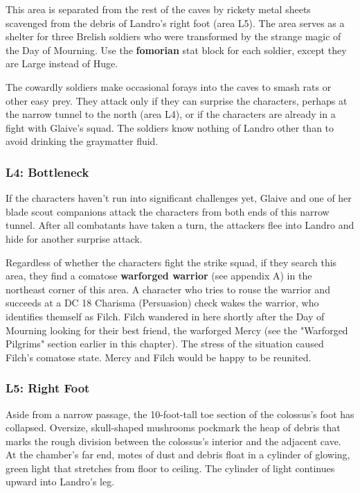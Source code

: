 \documentclass[10pt,a4paper,twoside,bg=print,twocolumn,openany,nodeprecatedcode]{dndbook}
\begin{document}
This area is separated from the rest of the caves by rickety metal sheets scavenged from the debris of Landro's right foot (area L5). The area serves as a shelter for three Brelish soldiers who were transformed by the strange magic of the Day of Mourning. Use the \textbf{fomorian} stat block for each soldier, except they are Large instead of Huge.

The cowardly soldiers make occasional forays into the caves to smash rats or other easy prey. They attack only if they can surprise the characters, perhaps at the narrow tunnel to the north (area L4), or if the characters are already in a fight with Glaive's squad. The soldiers know nothing of Landro other than to avoid drinking the graymatter fluid.

\subsubsection{L4: Bottleneck}
If the characters haven't run into significant challenges yet, Glaive and one of her blade scout companions attack the characters from both ends of this narrow tunnel. After all combatants have taken a turn, the attackers flee into Landro and hide for another surprise attack.

Regardless of whether the characters fight the strike squad, if they search this area, they find a comatose \textbf{warforged warrior} (see appendix A) in the northeast corner of this area. A character who tries to rouse the warrior and succeeds at a DC 18 Charisma (Persuasion) check wakes the warrior, who identifies themself as Filch. Filch wandered in here shortly after the Day of Mourning looking for their best friend, the warforged Mercy (see the "Warforged Pilgrims" section earlier in this chapter). The stress of the situation caused Filch's comatose state. Mercy and Filch would be happy to be reunited.

\subsubsection{L5: Right Foot}
\begin{DndReadAloud}{}
Aside from a narrow passage, the 10-foot-tall toe section of the colossus's foot has collapsed. Oversize, skull-shaped mushrooms pockmark the heap of debris that marks the rough division between the colossus's interior and the adjacent cave. At the chamber's far end, motes of dust and debris float in a cylinder of glowing, green light that stretches from floor to ceiling. The cylinder of light continues upward into Landro's leg.

\end{DndReadAloud}
\end{document}
